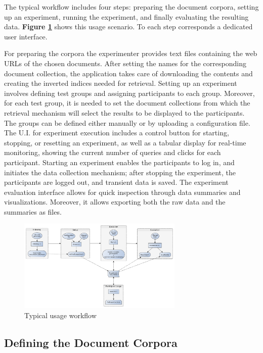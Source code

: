 \documentclass[a4paper]{usiinfbachelorproject}
\begin{document}
The typical workflow includes four steps: preparing the document corpora, setting up an experiment, running the experiment,
and finally evaluating the resulting data. \textbf{Figure \ref{fig:usage}} shows this usage scenario. 
To each step corresponds a dedicated user interface. 

For preparing the corpora the experimenter provides text files containing the web URLs of the chosen documents. After setting the names for the
corresponding document collection, the application takes care of downloading the contents and creating the inverted indices needed for retrieval.
Setting up an experiment involves defining test groups and assigning participants to each group. Moreover, for each test group, it is needed
to set the document collections from which the retrieval mechanism will select the results to be displayed to the participants.
The groups can be defined either manually or by uploading a configuration file.
The U.I. for experiment execution includes a control button for starting, stopping, or resetting an experiment, as well 
as a tabular display for real-time monitoring, showing the current number of queries and clicks for each participant.
Starting an experiment enables the participants to log in, and initiates the data collection mechanism; after
stopping the experiment, the participants are logged out, and transient data is saved.
The experiment evaluation interface  allows for quick inspection through data summaries and visualizations. Moreover, it allows
exporting both the raw data and the summaries as files.

\begin{figure}[h]
\centering
\includegraphics[width=0.7\textwidth]{figures/usage}
\caption{Typical usage workflow}
\label{fig:usage}
\end{figure}


\subsection{\textbf{Defining the Document Corpora}} \label{sec:designDefineDocs}
\end{document}
